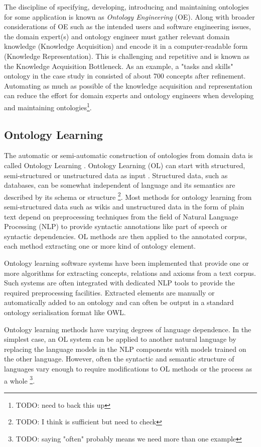\documentclass[a4paper]{report}
\newcommand{\todo}[1]{\footnote{{\color{red} TODO: #1}}}
\begin{document}
The discipline of specifying, developing, introducing and maintaining ontologies for some application is known as \emph{Ontology Engineering} (OE)\cite{HOO2009OntEngMeth}.
Along with broader considerations of OE such as the intended users and software engineering issues, the domain expert(s) and ontology engineer must gather relevant domain knowledge (Knowledge Acquisition) and encode it in a computer-readable form (Knowledge Representation)\cite{OntMethOverv1999}.
This is challenging and repetitive and is known as the Knowledge Acquisition Bottleneck\cite{OLforSemWeb2001}.
As an example, a "tasks and skills" ontology in the case study in \cite{HOO2009OntEngMeth} consisted of about 700 concepts after refinement. 
Automating as much as possible of the knowledge acquisition and representation can reduce the effort for domain experts and ontology engineers when developing and maintaining ontologies\todo{need to back this up}.

\subsection{Ontology Learning}

The automatic or semi-automatic construction of ontologies from domain data is called Ontology Learning \cite{Cimiano06}. 
Ontology Learning (OL) can start with structured, semi-structured or unstructured data as input \cite{Cimiano2009OL}.
Structured data, such as databases, can be somewhat independent of language and its semantics are described by its schema or structure \todo{I think \cite{Cimiano2009OL} is sufficient but need to check}.
Most methods for ontology learning from semi-structured data such as wikis and unstructured data in the form of plain text depend on preprocessing techniques from the field of Natural Language Processing (NLP) to provide syntactic annotations like part of speech or syntactic dependencies.
OL methods are then applied to the annotated corpus, each method extracting one or more kind of ontology element.

Ontology learning software systems have been implemented that provide one or more algorithms for extracting concepts, relations and axioms from a text corpus.
Such systems are often integrated with dedicated NLP tools to provide the required preprocessing facilities.
Extracted elements are manually or automatically added to an ontology and can often be output in a standard ontology serialisation format like OWL\cite{OWLOverview2004}.

Ontology learning methods have varying degrees of language dependence. 
In the simplest case, an OL system can be applied to another natural language by replacing the language models in the NLP components with models trained on the other language. 
However, often the syntactic and semantic structure of languages vary enough to require modifications to OL methods or the process as a whole \cite{Voelkner2008Spanish}\todo{saying "often" probably means we need more than one example}.
\end{document}
